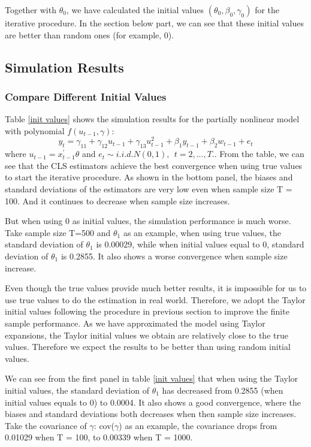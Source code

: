 \documentclass[a4paper,12pt,times,numbered,print,index]{report}
\numberwithin{equation}{section}
\begin{document}
Together with $\theta_0$, we have calculated the initial values $\left(\theta_{0}, \beta_{0}, \gamma_{0} \right) $ for the iterative procedure. In the section below part, we can see that these initial values are better than random ones (for example, 0).

\subsection{Simulation Results}

\subsubsection{Compare Different Initial Values}

Table \ref{init values} shows the simulation results for the partially nonlinear model with polynomial $f\left( u_{t-1},\gamma\right)$:
$$
y_{t}  = \gamma_{11}+ \gamma_{12}{u}_{t-1}+\gamma_{13}{u}_{t-1}^{2} +\beta_{1}y_{t-1} + \beta_2w_{t-1} +e_t
$$
where ${u}_{t-1} = x^{\prime}_{t-1}\theta$ and $e_{t}\sim i.i.d.N\left( 0,1\right) ,\ \ t=2,...,T$.. From the table, we can see that the CLS estimators achieve the best convergence when using true values to start the iterative procedure. As shown in the bottom panel, the biases and standard deviations of the estimators are very low even when sample size T = 100. And it continues to decrease when sample size increases.

But when using 0 as initial values, the simulation performance is much worse. Take sample size T=500 and $\theta_1$ as an example, when using true values, the standard deviation of $\theta_1$ is 0.00029, while when initial values equal to 0, standard deviation of $\theta_1$ is 0.2855.  It also shows a worse convergence when sample size increase.

Even though the true values provide much better results, it is impossible for us to use true values to do the estimation in real world. Therefore, we adopt the Taylor initial values following the procedure in previous section to improve the finite sample performance. As we have approximated the model using Taylor expansions, the Taylor initial values we obtain are relatively close to the true values. Therefore we expect the results to be better than using random initial values. 

We can see from the first panel in table \ref{init values} that when using the Taylor initial values, the standard deviation of $\theta_1$ has decreased from 0.2855 (when initial values equals to 0) to 0.0004. It also shows a good convergence, where the biases and standard deviations both decreases when then sample size increases. Take the covariance of $\gamma$: cov($\gamma$) as an example, the covariance drops from 0.01029 when T = 100, to 0.00339 when T = 1000. 
\end{document}
